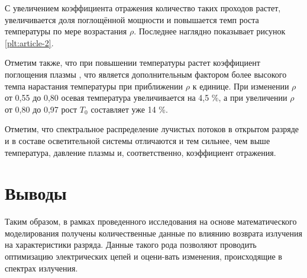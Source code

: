 С увеличением коэффициента отражения количество таких проходов растет, увеличивается доля поглощённой мощности и повышается темп роста температуры по мере возрастания $\rho$.
Последнее наглядно показывает рисунок \ref{plt:article-2}.

Отметим также, что при повышении температуры растет коэффициент поглощения плазмы \cite{article-8-gradov, article-9-gradov}, что является дополнительным фактором более высокого темпа нарастания температуры при приближении $\rho$ к единице.
При изменении $\rho$ от 0,55 до 0,80 осевая температура увеличивается на 4,5 \%, а при увеличении $\rho$ от 0,80 до 0,97 рост $T_0$ составляет уже 14 \%.

Отметим, что спектральное распределение лучистых потоков в открытом разряде и в составе осветительной системы отличаются и тем сильнее, чем выше температура, давление плазмы и, соответственно, коэффициент отражения.

\section*{Выводы}

Таким образом, в рамках проведенного исследования на основе математического моделирования получены количественные данные по влиянию возврата излучения на характеристики разряда. Данные такого рода позволяют проводить оптимизацию электрических цепей и оцени-вать изменения, происходящие в спектрах излучения.
